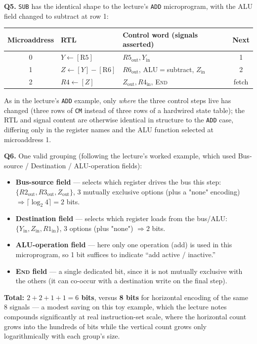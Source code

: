 \documentclass[11pt]{article}
\begin{document}
\textbf{Q5.} \texttt{SUB} has the identical shape to the lecture's \texttt{ADD} microprogram, with the ALU field changed to subtract at row 1:

\begin{center}
\small
\begin{tabular}{@{}cllc@{}}
\toprule
\textbf{Microaddress} & \textbf{RTL} & \textbf{Control word (signals asserted)} & \textbf{Next} \\
\midrule
0 & $Y \gets [\text{R5}]$ & $R5_{\text{out}}, Y_{\text{in}}$ & 1 \\
1 & $Z \gets [Y] - [\text{R6}]$ & $R6_{\text{out}}$, ALU$=$subtract, $Z_{\text{in}}$ & 2 \\
2 & $R4 \gets [Z]$ & $Z_{\text{out}}, R4_{\text{in}}$, \textsc{End} & fetch \\
\bottomrule
\end{tabular}
\end{center}

As in the lecture's \texttt{ADD} example, only \emph{where} the three control steps live has changed (three rows of \texttt{CM} instead of three rows of a hardwired state table); the RTL and signal content are otherwise identical in structure to the \texttt{ADD} case, differing only in the register names and the ALU function selected at microaddress 1.

\textbf{Q6.} One valid grouping (following the lecture's worked example, which used Bus-source / Destination / ALU-operation fields):
\begin{itemize}
  \item \textbf{Bus-source field} --- selects which register drives the bus this step: $\{R2_{\text{out}}, R3_{\text{out}}, Z_{\text{out}}\}$, 3 mutually exclusive options (plus a "none" encoding) $\Rightarrow \lceil \log_2 4 \rceil = 2$ bits.
  \item \textbf{Destination field} --- selects which register loads from the bus/ALU: $\{Y_{\text{in}}, Z_{\text{in}}, R1_{\text{in}}\}$, 3 options (plus "none") $\Rightarrow 2$ bits.
  \item \textbf{ALU-operation field} --- here only one operation (add) is used in this microprogram, so 1 bit suffices to indicate ``add active / inactive.''
  \item \textbf{\textsc{End} field} --- a single dedicated bit, since it is not mutually exclusive with the others (it can co-occur with a destination write on the final step).
\end{itemize}
\textbf{Total: $2 + 2 + 1 + 1 = 6$ bits}, versus \textbf{8 bits} for horizontal encoding of the same 8 signals --- a modest saving on this toy example, which the lecture notes compounds significantly at real instruction-set scale, where the horizontal count grows into the hundreds of bits while the vertical count grows only logarithmically with each group's size.
\end{document}
